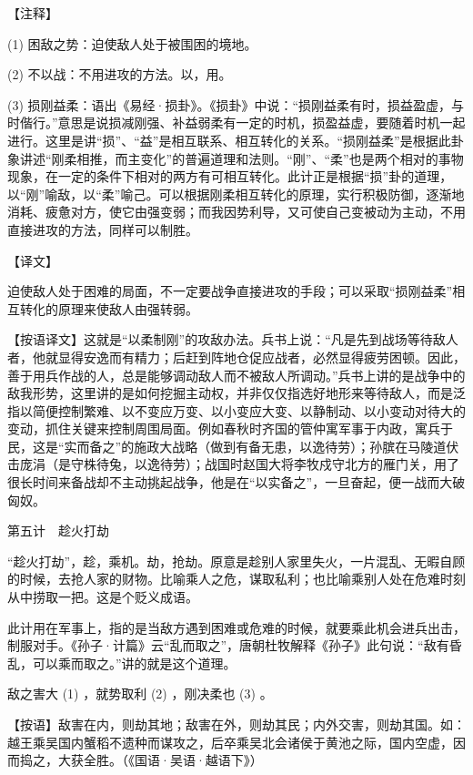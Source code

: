 \documentclass[12pt,UTF8]{ctexbook}
\begin{document}
【注释】


(1) 困敌之势：迫使敌人处于被围困的境地。

(2) 不以战：不用进攻的方法。以，用。

(3) 损刚益柔：语出《易经·损卦》。《损卦》中说：“损刚益柔有时，损益盈虚，与时偕行。”意思是说损减刚强、补益弱柔有一定的时机，损盈益虚，要随着时机一起进行。这里是讲“损”、“益”是相互联系、相互转化的关系。“损刚益柔”是根据此卦象讲述“刚柔相推，而主变化”的普遍道理和法则。“刚”、“柔”也是两个相对的事物现象，在一定的条件下相对的两方有可相互转化。此计正是根据“损”卦的道理，以“刚”喻敌，以“柔”喻己。可以根据刚柔相互转化的原理，实行积极防御，逐渐地消耗、疲惫对方，使它由强变弱；而我因势利导，又可使自己变被动为主动，不用直接进攻的方法，同样可以制胜。





【译文】


迫使敌人处于困难的局面，不一定要战争直接进攻的手段；可以采取“损刚益柔”相互转化的原理来使敌人由强转弱。

【按语译文】这就是“以柔制刚”的攻敌办法。兵书上说：“凡是先到战场等待敌人者，他就显得安逸而有精力；后赶到阵地仓促应战者，必然显得疲劳困顿。因此，善于用兵作战的人，总是能够调动敌人而不被敌人所调动。”兵书上讲的是战争中的敌我形势，这里讲的是如何挖掘主动权，并非仅仅指选好地形来等待敌人，而是泛指以简便控制繁难、以不变应万变、以小变应大变、以静制动、以小变动对待大的变动，抓住关键来控制周围局面。例如春秋时齐国的管仲寓军事于内政，寓兵于民，这是“实而备之”的施政大战略（做到有备无患，以逸待劳）；孙膑在马陵道伏击庞涓（是守株待兔，以逸待劳）；战国时赵国大将李牧戍守北方的雁门关，用了很长时间来备战却不主动挑起战争，他是在“以实备之”，一旦奋起，便一战而大破匈奴。





第五计　趁火打劫


“趁火打劫”，趁，乘机。劫，抢劫。原意是趁别人家里失火，一片混乱、无暇自顾的时候，去抢人家的财物。比喻乘人之危，谋取私利；也比喻乘别人处在危难时刻从中捞取一把。这是个贬义成语。

此计用在军事上，指的是当敌方遇到困难或危难的时候，就要乘此机会进兵出击，制服对手。《孙子·计篇》云“乱而取之”，唐朝杜牧解释《孙子》此句说：“敌有昏乱，可以乘而取之。”讲的就是这个道理。





敌之害大 (1) ，就势取利 (2) ，刚决柔也 (3) 。

【按语】敌害在内，则劫其地；敌害在外，则劫其民；内外交害，则劫其国。如：越王乘吴国内蟹稻不遗种而谋攻之，后卒乘吴北会诸侯于黄池之际，国内空虚，因而捣之，大获全胜。（《国语·吴语·越语下》）
\end{document}

